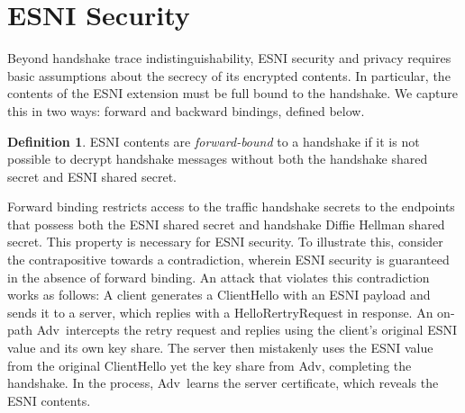 \documentclass{article}
\theoremstyle{definition}
\newcommand{\adv}{{\sf Adv}}
\theoremstyle{definition}
\newtheorem{definition}{Definition}[section]
\begin{document}

\section{ESNI Security}

Beyond handshake trace indistinguishability, ESNI security and privacy requires basic assumptions
about the secrecy of its encrypted contents. In particular, the contents of the ESNI extension must
be full bound to the handshake. We capture this in two ways: forward and backward bindings, defined 
below.

\begin{definition}
ESNI contents are \emph{forward-bound} to a handshake if it is not possible to decrypt handshake messages 
without both the handshake shared secret and ESNI shared secret.
\end{definition}

Forward binding restricts access to the traffic handshake secrets to the endpoints that possess both
the ESNI shared secret and handshake Diffie Hellman shared secret. This property is necessary for 
ESNI security. To illustrate this, consider the contrapositive towards a contradiction, wherein ESNI 
security is guaranteed in the absence of forward binding. An attack that violates this contradiction works 
as follows: A client generates a ClientHello with an ESNI payload and sends it to a server, which replies 
with a HelloRertryRequest in response. An on-path \adv\ intercepts the retry request and replies using
the client's original ESNI value and its own key share. The server then mistakenly uses the ESNI
value from the original ClientHello yet the key share from \adv, completing the handshake. In the
process, \adv\ learns the server certificate, which reveals the ESNI contents.
\end{document}
